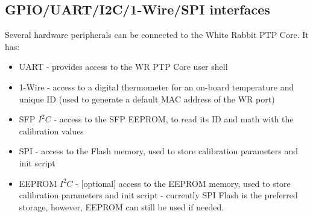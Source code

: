 \subsection{GPIO/UART/I2C/1-Wire/SPI interfaces}
\label{sec:wrpc_periph}


Several hardware peripherals can be connected to the White Rabbit PTP Core. It
has:
\begin{itemize}
  \item UART - provides access to the WR PTP Core user shell
  \item 1-Wire - access to a digital thermometer for an on-board temperature and
    unique ID (used to generate a default MAC address of the WR port)
  \item SFP $I^2C$ - access to the SFP EEPROM, to read its ID and math with the
    calibration values
  \item SPI - access to the Flash memory, used to store calibration
    parameters and init script
  \item EEPROM $I^2C$ - [optional] access to the EEPROM memory, used to store
    calibration parameters and init script - currently SPI Flash is the
    preferred storage, however, EEPROM can still be used if needed.
\end{itemize}
